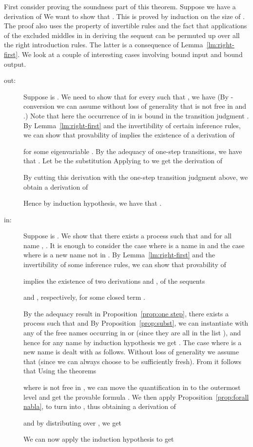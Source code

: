 \documentclass{acmtrans2m}
\begin{document}
First consider proving the soundness part of this theorem.
Suppose we have a derivation  of 
We want to show that . 
This is proved by induction on the size of . The proof also uses the property
of invertible rules and the fact that applications of the excluded middles in 
in deriving the sequent can be permuted up over all the right introduction rules.
The latter is a consequence of Lemma~\ref{lm:right-first}.
We look at a couple of interesting cases involving bound input and bound output.

\begin{description}

\item[out:] Suppose  is . We need to show that for every
 such that , we have  
(By -conversion we can assume without loss of generality that 
 is not free in  and .) Note that here the occurrence of  in  is bound 
in the transition judgment .
By Lemma~\ref{lm:right-first} and the invertibility of certain inference rules, we can
show that provability of 
implies the existence of a derivation  of 

for some eigenvariable . 
By the adequacy of one-step transitions, we have that 
.
Let  be the substitution 
Applying  to  we get the derivation  of

By cutting this derivation with the one-step transition judgment above, we obtain
a derivation of 

Hence by induction hypothesis, we have that .

\item[in:] Suppose  is . We show that there exists
a process  such that  and
for all name , . It is enough to consider
the case where  is a name in  and the case where 
is a new name not in . By Lemma~\ref{lm:right-first} and the invertibility
of some inference rules, we can show that provability of 

implies the existence of two derivations  and , of the sequents

and 
,
respectively, for some closed term .

By the adequacy result in Proposition~\ref{prop:one step},
there exists a process  such that  and 
By Proposition~\ref{prop:subst}, we can instantiate  with any of the free names occurring
in  or  (since they are all in the list ), and hence for any name 
by induction hypothesis we get . The case where  is a new name
is dealt with as follows. Without loss of generality we assume that  (since we can always
choose  to be sufficiently fresh).  
From  it follows that 
Using the  theorems

where  is not free in , we can move the  quantification in 
 to the outermost level and get
the provable formula 
.
We then apply Proposition~\ref{prop:forall nabla}, to turn  into , thus obtaining
a derivation of 

and by distributing  over , we get

We can now apply the induction hypothesis to get 
\end{description}
\end{document}
